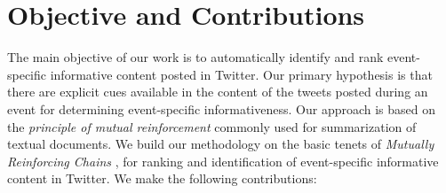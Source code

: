 \section{Objective and Contributions} The main objective of our work is to automatically identify and rank event-specific informative content posted in Twitter. Our primary hypothesis is that there are explicit cues available in the content of the tweets posted during an event for determining event-specific informativeness. Our approach is based on the \textit{principle of mutual reinforcement} commonly used for summarization of textual documents. We build our methodology on the basic tenets of \textit{Mutually Reinforcing Chains} \cite{wei2008query}, for ranking and identification of event-specific informative content in Twitter. We make the following contributions:






